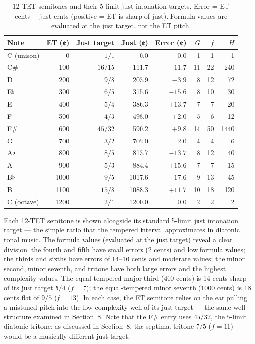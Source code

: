 \documentclass[11pt,a4paper]{article}
\begin{document}
\begin{table}[h]
\centering
\caption{12-TET semitones and their 5-limit just intonation targets.
Error = ET cents $-$ just cents (positive = ET is sharp of just).
Formula values are evaluated at the just target, not the ET pitch.}
\label{tab:tet}
\smallskip
\begin{tabular}{lrrrrrrr}
\toprule
Note & ET (¢) & Just target & Just (¢) & Error (¢) & $G$ & $f$ & $H$ \\
\midrule
C  (unison)  &    0 & $1/1$   &    0.0 & $0.0$    &  1 &  1 &    1 \\
C\#          &  100 & $16/15$ &  111.7 & $-11.7$  & 11 & 22 &  240 \\
D            &  200 & $9/8$   &  203.9 & $-3.9$   &  8 & 12 &   72 \\
E$\flat$     &  300 & $6/5$   &  315.6 & $-15.6$  &  8 & 10 &   30 \\
E            &  400 & $5/4$   &  386.3 & $+13.7$  &  7 &  7 &   20 \\
F            &  500 & $4/3$   &  498.0 & $+2.0$   &  5 &  6 &   12 \\
F\#          &  600 & $45/32$ &  590.2 & $+9.8$   & 14 & 50 & 1440 \\
G            &  700 & $3/2$   &  702.0 & $-2.0$   &  4 &  4 &    6 \\
A$\flat$     &  800 & $8/5$   &  813.7 & $-13.7$  &  8 & 12 &   40 \\
A            &  900 & $5/3$   &  884.4 & $+15.6$  &  7 &  7 &   15 \\
B$\flat$     & 1000 & $9/5$   & 1017.6 & $-17.6$  &  9 & 13 &   45 \\
B            & 1100 & $15/8$  & 1088.3 & $+11.7$  & 10 & 18 &  120 \\
C  (octave)  & 1200 & $2/1$   & 1200.0 & $0.0$    &  2 &  2 &    2 \\
\bottomrule
\end{tabular}
\end{table}

\noindent
Each 12-TET semitone is shown alongside its standard 5-limit just intonation
target --- the simple ratio that the tempered interval approximates in
diatonic tonal music. The formula values (evaluated at the just target) reveal
a clear division: the fourth and fifth have small errors (2 cents) and low
formula values; the thirds and sixths have errors of 14--16 cents and moderate
values; the minor second, minor seventh, and tritone have both large errors
and the highest complexity values. The equal-tempered major third (400 cents)
is 14 cents sharp of its just target $5/4$ ($f = 7$); the equal-tempered
minor seventh (1000 cents) is 18 cents flat of $9/5$ ($f = 13$). In each
case, the ET semitone relies on the ear pulling a mistuned pitch into the
low-complexity well of its just target --- the same well structure examined in
Section~8. Note that the F\# entry uses $45/32$, the 5-limit diatonic
tritone; as discussed in Section~8, the septimal tritone $7/5$ ($f = 11$)
would be a musically different just target.
\end{document}
